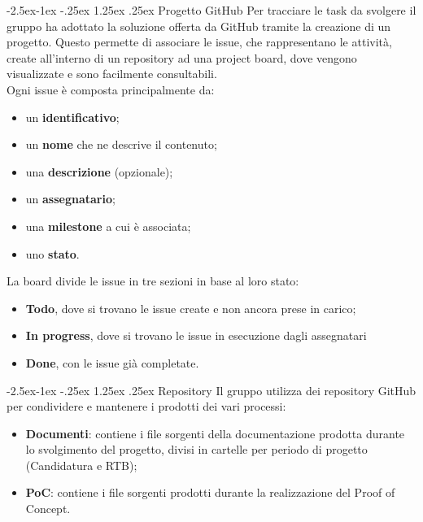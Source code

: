 \documentclass[a4paper,12pt]{article}
\makeatletter
\renewcommand\paragraph{\@startsection{paragraph}{4}{\z@}%
            {-2.5ex\@plus -1ex \@minus -.25ex}%
            {1.25ex \@plus .25ex}%
            {\normalfont\normalsize\bfseries}}
\makeatother
\begin{document}
            \paragraph{Progetto GitHub}
                Per tracciare le task da svolgere il gruppo ha adottato la soluzione offerta da GitHub tramite la creazione di un progetto.
                Questo permette di associare le issue, che rappresentano le attività, create all'interno di un repository ad una project board, dove vengono visualizzate e sono facilmente consultabili.\\
                Ogni issue è composta principalmente da:
                \begin{itemize}
                    \item un \textbf{identificativo};
                    \item un \textbf{nome} che ne descrive il contenuto;
                    \item una \textbf{descrizione} (opzionale);
                    \item un \textbf{assegnatario};
                    \item una \textbf{milestone} a cui è associata;
                    \item uno \textbf{stato}.
                \end{itemize}
                La board divide le issue in tre sezioni in base al loro stato:
                \begin{itemize}
                    \item \textbf{Todo}, dove si trovano le issue create e non ancora prese in carico;
                    \item \textbf{In progress}, dove si trovano le issue in esecuzione dagli assegnatari
                    \item \textbf{Done}, con le issue già completate.
                \end{itemize}

            \paragraph{Repository}
                Il gruppo utilizza dei repository GitHub per condividere e mantenere i prodotti dei vari processi:
                \begin{itemize}
                    \item \textbf{Documenti}: contiene i file sorgenti della documentazione prodotta durante lo svolgimento del progetto, divisi in cartelle per periodo di progetto (Candidatura e RTB);
                    \item \textbf{PoC}: contiene i file sorgenti prodotti durante la realizzazione del Proof of Concept.
                \end{itemize}
\end{document}
